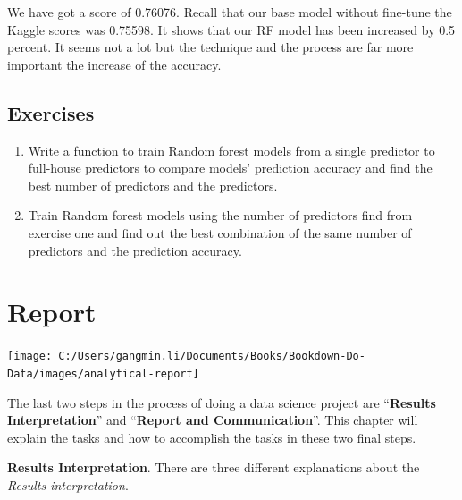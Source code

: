 \documentclass[
]{book}
\begin{document}
We have got a score of 0.76076. Recall that our base model without fine-tune the Kaggle scores was 0.75598. It shows that our RF model has been increased by 0.5 percent. It seems not a lot but the technique and the process are far more important the increase of the accuracy.

\hypertarget{exercises-8}{%
\section*{Exercises}\label{exercises-8}}


\begin{enumerate}
\def\labelenumi{\arabic{enumi}.}
\item
  Write a function to train Random forest models from a single predictor to full-house predictors to compare models' prediction accuracy and find the best number of predictors and the predictors.
\item
  Train Random forest models using the number of predictors find from exercise one and find out the best combination of the same number of predictors and the prediction accuracy.
\end{enumerate}

\hypertarget{report}{%
\chapter{Report}\label{report}}

\begin{center}\texttt{[image: C:/Users/gangmin.li/Documents/Books/Bookdown-Do-Data/images/analytical-report]} \end{center}

The last two steps in the process of doing a data science project are ``\textbf{Results Interpretation}'' and ``\textbf{Report and Communication}''. This chapter will explain the tasks and how to accomplish the tasks in these two final steps.

\textbf{Results Interpretation}. There are three different explanations about the \emph{Results interpretation}.
\end{document}
